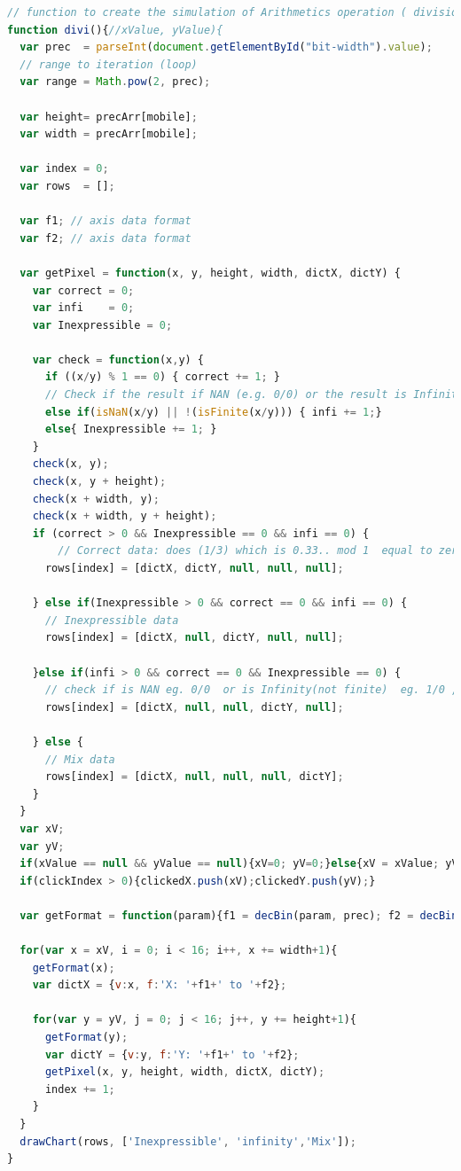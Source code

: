 \documentclass[11pt]{article}
\begin{document}
\begin{lstlisting}[label={lst:divi}, language=Javascript, caption={divi function},]
// function to create the simulation of Arithmetics operation ( division )
function divi(){//xValue, yValue){
  var prec  = parseInt(document.getElementById("bit-width").value);
  // range to iteration (loop)
  var range = Math.pow(2, prec);

  var height= precArr[mobile];
  var width = precArr[mobile];

  var index = 0;
  var rows  = [];

  var f1; // axis data format 
  var f2; // axis data format

  var getPixel = function(x, y, height, width, dictX, dictY) {
    var correct = 0;
    var infi    = 0;
    var Inexpressible = 0;

    var check = function(x,y) {
      if ((x/y) % 1 == 0) { correct += 1; }
      // Check if the result if NAN (e.g. 0/0) or the result is Infinity (e.g. 1/0, 2/0, ...)
      else if(isNaN(x/y) || !(isFinite(x/y))) { infi += 1;}
      else{ Inexpressible += 1; } 
    }
    check(x, y);
    check(x, y + height);
    check(x + width, y);
    check(x + width, y + height);
    if (correct > 0 && Inexpressible == 0 && infi == 0) {
        // Correct data: does (1/3) which is 0.33.. mod 1  equal to zero
      rows[index] = [dictX, dictY, null, null, null];

    } else if(Inexpressible > 0 && correct == 0 && infi == 0) {
      // Inexpressible data
      rows[index] = [dictX, null, dictY, null, null];

    }else if(infi > 0 && correct == 0 && Inexpressible == 0) {
      // check if is NAN eg. 0/0  or is Infinity(not finite)  eg. 1/0 , 1000/0
      rows[index] = [dictX, null, null, dictY, null];

    } else {
      // Mix data
      rows[index] = [dictX, null, null, null, dictY];
    }
  }
  var xV;
  var yV; 
  if(xValue == null && yValue == null){xV=0; yV=0;}else{xV = xValue; yV = yValue;}
  if(clickIndex > 0){clickedX.push(xV);clickedY.push(yV);}
  
  var getFormat = function(param){f1 = decBin(param, prec); f2 = decBin(param+height, prec);}
  
  for(var x = xV, i = 0; i < 16; i++, x += width+1){
    getFormat(x);
    var dictX = {v:x, f:'X: '+f1+' to '+f2};
  
    for(var y = yV, j = 0; j < 16; j++, y += height+1){
      getFormat(y);
      var dictY = {v:y, f:'Y: '+f1+' to '+f2};
      getPixel(x, y, height, width, dictX, dictY);
      index += 1;
    }
  }
  drawChart(rows, ['Inexpressible', 'infinity','Mix']);
}
\end{lstlisting}
\end{document}
